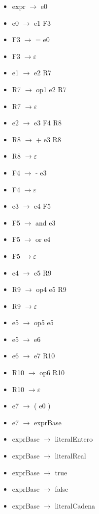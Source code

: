 \documentclass[11pt]{article}
\begin{document}
        \begin{itemize}
            \item expr $\rightarrow$ e0
            \item e0 $\rightarrow$ e1 F3
            \item F3 $\rightarrow$ = e0
            \item F3 $\rightarrow \varepsilon$
            \item e1 $\rightarrow$ e2 R7
            \item R7 $\rightarrow$ op1 e2 R7
            \item R7 $\rightarrow \varepsilon$
            \item e2 $\rightarrow$ e3 F4 R8
            \item R8 $\rightarrow$ + e3 R8
            \item R8 $\rightarrow \varepsilon$
            \item F4 $\rightarrow$ - e3
            \item F4 $\rightarrow \varepsilon$
            \item e3 $\rightarrow$ e4 F5
            \item F5 $\rightarrow$ and e3
            \item F5 $\rightarrow$ or e4
            \item F5 $\rightarrow \varepsilon$
            \item e4 $\rightarrow$ e5 R9
            \item R9 $\rightarrow$ op4 e5 R9
            \item R9 $\rightarrow \varepsilon$
            \item e5 $\rightarrow$ op5 e5
            \item e5 $\rightarrow$ e6
            \item e6 $\rightarrow$ e7 R10
            \item R10 $\rightarrow$ op6 R10
            \item R10 $\rightarrow \varepsilon$
            \item e7 $\rightarrow$ ( e0 )
            \item e7 $\rightarrow$ exprBase
            \item exprBase $\rightarrow$ literalEntero
            \item exprBase $\rightarrow$ literalReal
            \item exprBase $\rightarrow$ true
            \item exprBase $\rightarrow$ false
            \item exprBase $\rightarrow$ literalCadena

\end{itemize}
\end{document}

